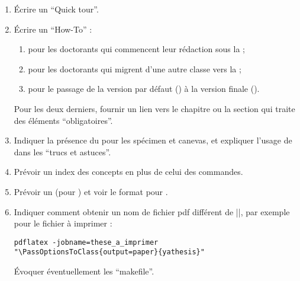 \begin{enumerate}
\item Écrire un \foreignquote{english}{Quick tour}.
\item Écrire un \foreignquote{english}{How-To} :
  \begin{enumerate}
  \item pour les doctorants qui commencent leur rédaction sous la \yatCl{} ;
  \item pour les doctorants qui migrent d'une autre classe vers la \yatCl{} ;
  \item pour le passage de la version par défaut () à la
    version finale ().
  \end{enumerate}
  Pour les deux derniers, fournir un lien vers le chapitre ou la section qui
  traite des éléments \enquote{obligatoires}.
\item Indiquer la présence du  pour les spécimen et canevas, et
  expliquer l'usage de  dans les \enquote{trucs et astuces}.
\item Prévoir un index des concepts en plus de celui des commandes.
\item Prévoir un  (pour ) et voir le format
  pour .
\item Indiquer comment obtenir un nom de fichier \acrshort{pdf} différent de
  |\jobname|, par exemple pour le fichier à imprimer :
  \lstset{escapechar=}
\begin{lstlisting}
pdflatex -jobname=these_a_imprimer "\PassOptionsToClass{output=paper}{yathesis}"
\end{lstlisting}
  \lstset{escapechar="}%
Évoquer éventuellement les \enquote{makefile}.
\end{enumerate}

%
\iffalse
\fi
